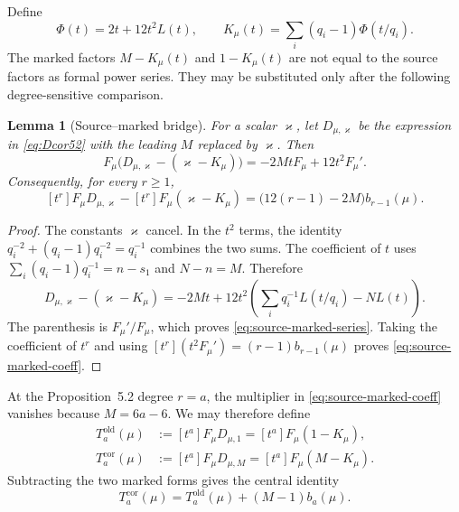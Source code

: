 \documentclass[11pt]{article}
\newtheorem{lemma}[theorem]{Lemma}
\theoremstyle{definition}
\theoremstyle{remark}
\begin{document}
Define
\begin{equation}\label{eq:Kdef52}
 \Phi(t)=2t+12t^2L(t),
 \qquad
 K_\mu(t)=\sum_i(q_i-1)\Phi(t/q_i).
\end{equation}
The marked factors $M-K_\mu(t)$ and $1-K_\mu(t)$ are not equal to the source
factors as formal power series.  They may be substituted only after the
following degree-sensitive comparison.

\begin{lemma}[Source--marked bridge]\label{lem:bridge52}
For a scalar $\varkappa$, let $D_{\mu,\varkappa}$ be the expression in
\eqref{eq:Dcor52} with the leading $M$ replaced by $\varkappa$.  Then
\begin{equation}\label{eq:source-marked-series}
 F_\mu\bigl(D_{\mu,\varkappa}-(\varkappa-K_\mu)\bigr)
 =-2MtF_\mu+12t^2F_\mu'.
\end{equation}
Consequently, for every $r\ge1$,
\begin{equation}\label{eq:source-marked-coeff}
 [t^r]F_\mu D_{\mu,\varkappa}
 -[t^r]F_\mu(\varkappa-K_\mu)
 =\bigl(12(r-1)-2M\bigr)b_{r-1}(\mu).
\end{equation}
\end{lemma}

\begin{proof}
The constants $\varkappa$ cancel.  In the $t^2$ terms, the identity
$q_i^{-2}+(q_i-1)q_i^{-2}=q_i^{-1}$ combines the two sums.  The coefficient
of $t$ uses
$\sum_i(q_i-1)q_i^{-1}=n-s_1$ and $N-n=M$.  Therefore
\[
 D_{\mu,\varkappa}-(\varkappa-K_\mu)
 =-2Mt+12t^2\left(\sum_iq_i^{-1}L(t/q_i)-NL(t)\right).
\]
The parenthesis is $F_\mu'/F_\mu$, which proves
\eqref{eq:source-marked-series}.  Taking the coefficient of $t^r$ and using
$[t^r](t^2F_\mu')=(r-1)b_{r-1}(\mu)$ proves
\eqref{eq:source-marked-coeff}.
\end{proof}

At the Proposition~5.2 degree $r=a$, the multiplier in
\eqref{eq:source-marked-coeff} vanishes because $M=6a-6$.  We may therefore
define
\begin{align}
 T_a^{\mathrm{old}}(\mu)
   &:=[t^a]F_\mu D_{\mu,1}
     =[t^a]F_\mu(1-K_\mu),
 \label{eq:Told-def}\\
 T_a^{\mathrm{cor}}(\mu)
   &:=[t^a]F_\mu D_{\mu,M}
     =[t^a]F_\mu(M-K_\mu).
 \label{eq:Tcor-def}
\end{align}
Subtracting the two marked forms gives the central identity
\begin{equation}\label{eq:central52}
 \boxed{\ T_a^{\mathrm{cor}}(\mu)
 =T_a^{\mathrm{old}}(\mu)+(M-1)b_a(\mu).\ }
\end{equation}
\end{document}
